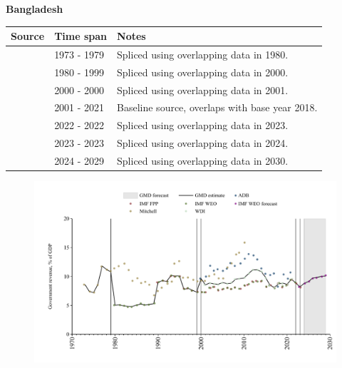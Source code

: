 \documentclass[12pt,a4paper,landscape]{article}
\begin{document}
\begin{adjustbox}{max totalsize={\paperwidth}{\paperheight},center}
\begin{minipage}[t][\textheight][t]{\textwidth}
\vspace*{0.5cm}
{}
\begin{center}
{\Large\bfseries Bangladesh}
\end{center}
\vspace{0.5cm}
\begin{table}[H]
\centering
\small
\begin{tabular}{|l|l|l|}
\hline
\textbf{Source} & \textbf{Time span} & \textbf{Notes} \\
\hline
\rowcolor{white}\cite{Mitchell}& 1973 - 1979 &Spliced using overlapping data in 1980.\\
\rowcolor{lightgray}\cite{IMF_WEO}& 1980 - 1999 &Spliced using overlapping data in 2000.\\
\rowcolor{white}\cite{ADB}& 2000 - 2000 &Spliced using overlapping data in 2001.\\
\rowcolor{lightgray}\cite{WDI}& 2001 - 2021 &Baseline source, overlaps with base year 2018.\\
\rowcolor{white}\cite{IMF_WEO}& 2022 - 2022 &Spliced using overlapping data in 2023.\\
\rowcolor{lightgray}\cite{IMF_FPP}& 2023 - 2023 &Spliced using overlapping data in 2024.\\
\rowcolor{white}\cite{IMF_WEO_forecast}& 2024 - 2029 &Spliced using overlapping data in 2030.\\
\hline
\end{tabular}
\end{table}
\begin{figure}[H]
\centering
\includegraphics[width=\textwidth,height=0.6\textheight,keepaspectratio]{graphs/BGD_govrev_GDP.pdf}
\end{figure}
\end{minipage}
\end{adjustbox}
\end{document}
